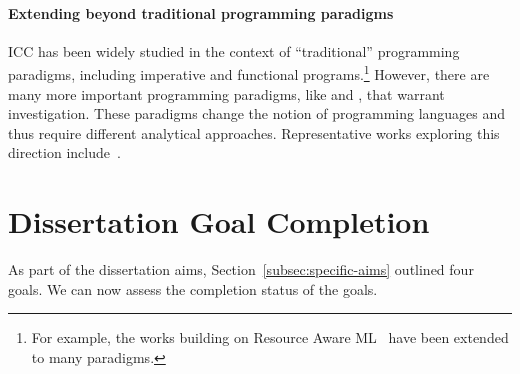 \paragraph*{Extending beyond traditional programming paradigms}
ICC has been widely studied in the context of \enquote{traditional} programming
paradigms, including imperative and functional programs.\footnote{ For example,
the works building on Resource Aware ML~\cite{hoffmann2012} have been extended
to many paradigms.} However, there are many more important programming
paradigms, like  and , that
warrant investigation. These paradigms change the notion of programming
languages and thus require different analytical approaches. Representative works
exploring this direction include~\cite{avanzini2024,colledan2024,avanzini2020}.

\section{Dissertation Goal Completion}
\label{sec:res-summary}

As part of the dissertation aims, Section~\autoref{subsec:specific-aims} outlined
four goals. We can now assess the completion status of the goals.

